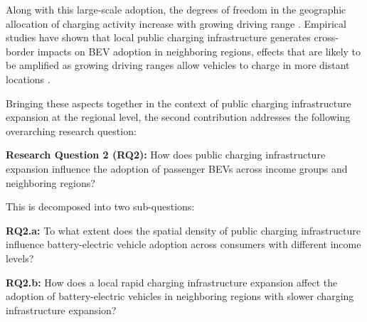     Along with this large-scale adoption, the degrees of freedom in the geographic allocation of charging activity increase with growing driving range \citep{SPAVEN2022133349}. Empirical studies have shown that local public charging infrastructure generates cross-border impacts on \ac{BEV} adoption in neighboring regions, effects that are likely to be amplified as growing driving ranges allow vehicles to charge in more distant locations \citep{QIAN2024104400, SELENASHENG2022103256}. 

    Bringing these aspects together in the context of public charging infrastructure expansion at the regional level, the second contribution addresses the following overarching research question:

    \textbf{Research Question 2 (RQ2):} How does public charging infrastructure expansion influence the adoption of passenger \acp{BEV} across income groups and neighboring regions?

    \noindent This is decomposed into two sub-questions:

    \textbf{RQ2.a:} To what extent does the spatial density of public charging infrastructure influence battery-electric vehicle adoption across consumers with different income levels?

    \textbf{RQ2.b:} How does a local rapid charging infrastructure expansion affect the adoption of battery-electric vehicles in neighboring regions with slower charging infrastructure expansion?

